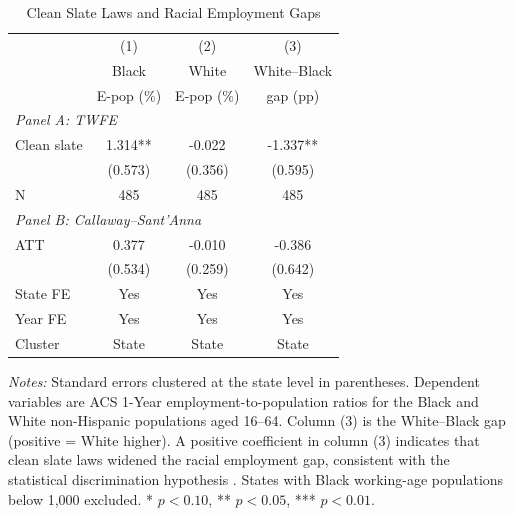 \begin{table}[H]
\centering
\caption{Clean Slate Laws and Racial Employment Gaps}
\begin{threeparttable}
\begin{tabular}{lccc}
\toprule
 & (1) & (2) & (3) \\
 & Black & White & White--Black \\
 & E-pop (\%) & E-pop (\%) & gap (pp) \\
\midrule
\multicolumn{4}{l}{\textit{Panel A: TWFE}} \\
Clean slate & 1.314** & -0.022 & -1.337** \\
 & (0.573) & (0.356) & (0.595) \\
N & 485 & 485 & 485 \\
\midrule
\multicolumn{4}{l}{\textit{Panel B: Callaway--Sant'Anna}} \\
ATT & 0.377 & -0.010 & -0.386 \\
 & (0.534) & (0.259) & (0.642) \\
\midrule
State FE & Yes & Yes & Yes \\
Year FE & Yes & Yes & Yes \\
Cluster & State & State & State \\
\bottomrule
\end{tabular}
\begin{tablenotes}[flushleft]
\small
\item \textit{Notes:} Standard errors clustered at the state level in parentheses. Dependent variables are ACS 1-Year employment-to-population ratios for the Black and White non-Hispanic populations aged 16--64. Column (3) is the White--Black gap (positive = White higher). A positive coefficient in column (3) indicates that clean slate laws widened the racial employment gap, consistent with the statistical discrimination hypothesis \citep{doleac2020}. States with Black working-age populations below 1,000 excluded. * $p<0.10$, ** $p<0.05$, *** $p<0.01$.
\end{tablenotes}
\end{threeparttable}
\label{tab:racial_gap}
\end{table}

